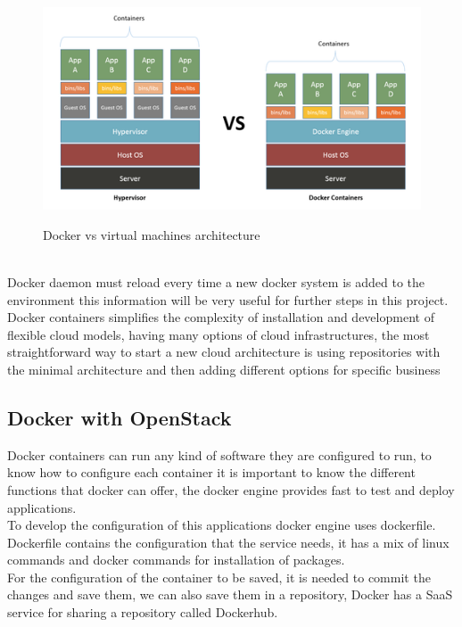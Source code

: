 \begin{figure}[bth]
{\includegraphics[width=1\linewidth]{gfx/dockerarchitecture}}\caption[Docker vs virtual machines architecture]{Docker vs virtual machines architecture \cite{14}}
\label{fig:dockerarchitecture}
\end{figure}\\


Docker daemon must reload every time a new docker system is added to the environment this information will be very useful for further steps in this project.\\

Docker containers simplifies the complexity of installation and development of flexible cloud models, having many options of cloud infrastructures, the most straightforward way to start a new cloud architecture is using repositories with the minimal architecture and then adding different options for specific business\\

\subsection{Docker with OpenStack}

Docker containers can run any kind of software they are configured to run, to know how to configure each container it is important to know the different functions that docker can offer, the docker engine provides fast to test and deploy applications.\\

To develop the configuration of this applications docker engine uses dockerfile. Dockerfile contains the configuration that the service needs, it has a mix of linux commands and docker commands for installation of packages.\\

For the configuration of the container to be saved, it is needed to commit the changes and save them, we can also save them in a repository, Docker has a SaaS service for sharing a repository called Dockerhub.\cite{4}\\

